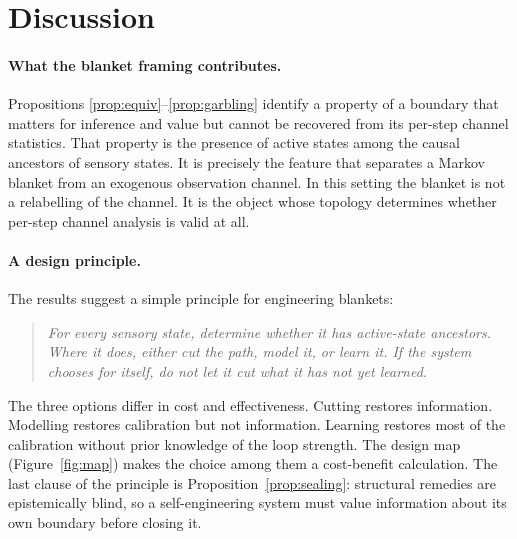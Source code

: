 \documentclass[11pt]{article}
\theoremstyle{definition}
\theoremstyle{remark}
\begin{document}
\section{Discussion}\label{sec:discussion}

\paragraph{What the blanket framing contributes.} Propositions
\ref{prop:equiv}--\ref{prop:garbling} identify a property of a boundary that
matters for inference and value but cannot be recovered from its per-step
channel statistics. That property is the presence of active states among the
causal ancestors of sensory states. It is precisely the feature that separates a
Markov blanket from an exogenous observation channel. In this setting the
blanket is not a relabelling of the channel. It is the object whose topology
determines whether per-step channel analysis is valid at all.

\paragraph{A design principle.} The results suggest a simple principle for
engineering blankets:
\begin{quote}
\emph{For every sensory state, determine whether it has active-state ancestors.
Where it does, either cut the path, model it, or learn it. If the system
chooses for itself, do not let it cut what it has not yet learned.}
\end{quote}
The three options differ in cost and effectiveness. Cutting restores
information. Modelling restores calibration but not information. Learning
restores most of the calibration without prior knowledge of the loop strength.
The design map (Figure~\ref{fig:map}) makes the choice among them a cost-benefit
calculation. The last clause of the principle is Proposition~\ref{prop:sealing}:
structural remedies are epistemically blind, so a self-engineering system must
value information about its own boundary before closing it.
\end{document}
